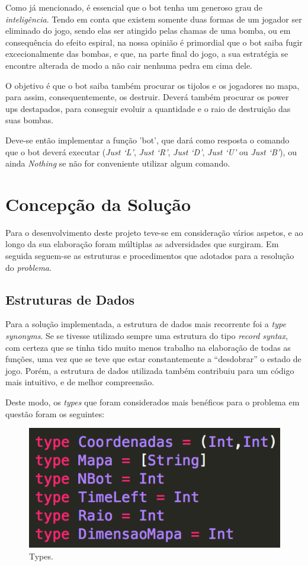 \documentclass[a4paper]{article}
\begin{document}
Como já mencionado, é essencial que o bot tenha um generoso grau de \emph{inteligência}. Tendo
em conta que existem somente duas formas de um jogador ser eliminado do jogo, sendo elas 
ser atingido pelas chamas de uma bomba, ou em consequência do efeito espiral, na nossa opinião 
é primordial que o bot saiba fugir excecionalmente das bombas, e que, na parte final do 
jogo, a sua estratégia se encontre alterada de modo a não cair nenhuma pedra em cima dele.

O objetivo é que o bot saiba também procurar os tijolos e os jogadores no mapa, 
para assim, consequentemente, os destruir. Deverá também procurar os power ups destapados, 
para conseguir evoluir a quantidade e o raio de destruição das suas bombas. 

Deve-se então implementar a função \textsf{'bot'}, que dará como resposta o comando que o 
bot deverá executar (\emph{Just ‘L’}, \emph{Just ‘R’}, \emph{Just ‘D’}, \emph{Just ‘U’} ou \emph{Just ‘B’}), 
ou ainda \textit{Nothing} se não for conveniente utilizar algum comando.

\section{Concepção da Solução}
\label{sec:solucao}

Para o desenvolvimento deste projeto teve-se em consideração
vários aspetos, e ao longo da sua elaboração foram múltiplas as adversidades 
que surgiram. Em seguida seguem-se as estruturas e procedimentos que adotados 
para a resolução do \emph{problema}.

\subsection{Estruturas de Dados}

Para a solução implementada, a estrutura de dados mais recorrente foi a \emph{type synonyms}. 
Se se tivesse utilizado sempre uma estrutura do tipo \emph{record syntax}, 
com certeza que se tinha tido muito menos trabalho na elaboração de todas as funções, 
uma vez que se teve que estar constantemente a “desdobrar” o estado de jogo. Porém, 
a estrutura de dados utilizada também contribuiu para um código mais \textrm{intuitivo}, 
e de melhor \textrm{compreensão}.

Deste modo, os \emph{types} que foram considerados mais benéficos para o problema 
em questão foram os seguintes: 

\begin{figure}[H]
\centering 
\includegraphics[scale=0.50]{types}
\caption{Types.}
\end{figure}
\end{document}
